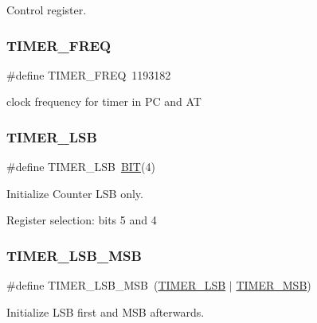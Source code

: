 Control register. 

\hypertarget{group__i8254_gacf926951944b6cf370b7229ebd50dd8b}{}\label{group__i8254_gacf926951944b6cf370b7229ebd50dd8b} 
\subsubsection{\texorpdfstring{T\+I\+M\+E\+R\+\_\+\+F\+R\+EQ}{TIMER\_FREQ}}
{\footnotesize\ttfamily \#define T\+I\+M\+E\+R\+\_\+\+F\+R\+EQ~1193182}



clock frequency for timer in PC and AT 

\hypertarget{group__i8254_gac18cb814ebd0d67235392c330e0e3504}{}\label{group__i8254_gac18cb814ebd0d67235392c330e0e3504} 
\subsubsection{\texorpdfstring{T\+I\+M\+E\+R\+\_\+\+L\+SB}{TIMER\_LSB}}
{\footnotesize\ttfamily \#define T\+I\+M\+E\+R\+\_\+\+L\+SB~\hyperlink{group___serial_ga3a8ea58898cb58fc96013383d39f482c}{B\+IT}(4)}



Initialize Counter L\+SB only. 

Register selection\+: bits 5 and 4 \hypertarget{group__i8254_ga8c0f1933323274c765e23837e4fbc8c7}{}\label{group__i8254_ga8c0f1933323274c765e23837e4fbc8c7} 
\subsubsection{\texorpdfstring{T\+I\+M\+E\+R\+\_\+\+L\+S\+B\+\_\+\+M\+SB}{TIMER\_LSB\_MSB}}
{\footnotesize\ttfamily \#define T\+I\+M\+E\+R\+\_\+\+L\+S\+B\+\_\+\+M\+SB~(\hyperlink{group__i8254_gac18cb814ebd0d67235392c330e0e3504}{T\+I\+M\+E\+R\+\_\+\+L\+SB} $\vert$ \hyperlink{group__i8254_ga2a8a6d363c612d756cd8d78480f7cd04}{T\+I\+M\+E\+R\+\_\+\+M\+SB})}



Initialize L\+SB first and M\+SB afterwards. 

